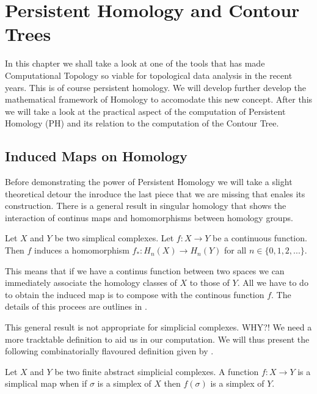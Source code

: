 \chapter{Persistent Homology and Contour Trees}
\label{chapter4}

In this chapter we shall take a look at one of the tools that has made Computational Topology so viable for topological data analysis in the recent years. This is of course persistent homology. We will develop further develop the mathematical framework of Homology to accomodate this new concept. After this we will take a look at the practical aspect of the computation of Persistent Homology (PH) and its relation to the computation of the Contour Tree.

\section{Induced Maps on Homology}

Before demonstrating the power of Persistent Homology we will take a slight theoretical detour the inroduce the last piece that we are missing that enales its construction. There is a general result in singular homology that shows the interaction of continus maps and homomorphisms between homology groups.

\begin{defn} Let $X$ and $Y$ be two simplical complexes. Let $f: X \to Y$ be a continuous function. Then $f$ induces a homomorphism $f_*: H_n(X) \to H_n(Y)$ for all $n \in \{0, 1, 2, ...\}$. \end{defn}

This means that if we have a continus function between two spaces we can immediately associate the homology classes of $X$ to those of $Y$. All we have to do to obtain the induced map is to compose with the continous function $f$. The details of this procees are outlines in \cite{algebraic-topology}.


This general result is not appropriate for simplicial complexes. WHY?! We need a more tracktable definition to aid us in our computation. We will thus present the following combinatorially flavoured definition given by \cite{combinatorial-algebraic-topology}. 


\begin{defn} Let $X$ and $Y$ be two finite abstract simplicial complexes. A function $f: X \to Y$ is a simplical map when if $\sigma$ is a simplex of $X$ then $f(\sigma)$ is a simplex of $Y$. \end{defn}

